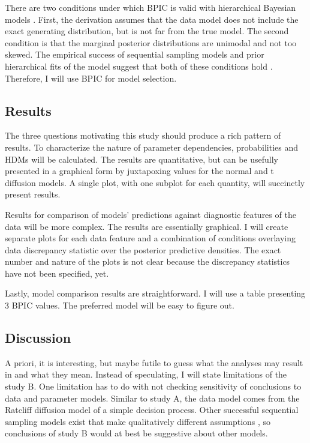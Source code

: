 \documentclass[12pt]{report}
\begin{document}
There are two conditions under which BPIC is valid with
hierarchical Bayesian models \citep{Ano2011}. First, the derivation
assumes that the data model does not include the exact
generating distribution, but is not far from the true model. The
second condition is that the marginal posterior distributions
are unimodal and not too skewed. The empirical success of sequential sampling models \citep{UshMcc2001,RatMck2008,BroHea2008} and prior
hierarchical fits of the model suggest that both of these conditions
hold \citep{VanTue2011,WieSof2013}. Therefore, I will use BPIC for model selection.

\subsection{Results}

The three questions motivating this study should produce a rich pattern of results. To characterize the nature of parameter dependencies, probabilities and HDMs will be calculated. The results are quantitative, but can be usefully presented in a graphical form by juxtapoxing values for the normal and t diffusion models. A single plot, with one subplot for each quantity, will succinctly present results. 

Results for comparison of models' predictions against diagnostic features of the data will be more complex. The results are essentially graphical. I will create separate plots for each data feature and a combination of conditions overlaying data discrepancy statistic over the posterior predictive densities. The exact number and nature of the plots is not clear because the discrepancy statistics have not been specified, yet.

Lastly, model comparison results are straightforward. I will use a table presenting 3 BPIC values. The preferred model will be easy to figure out. 


\subsection{Discussion}

A priori, it is interesting, but maybe futile to guess what the analyses may result in and what they mean. Instead of speculating, I will state limitations of the study B. One limitation has to do with not checking sensitivity of conclusions to data and parameter models. Similar to study A, the data model comes from the Ratcliff diffusion model of a simple decision process. Other successful sequential sampling models exist that make qualitatively different assumptions \citep{RatSmi2004}, so conclusions of study B would at best be suggestive about other models. 
\end{document}
